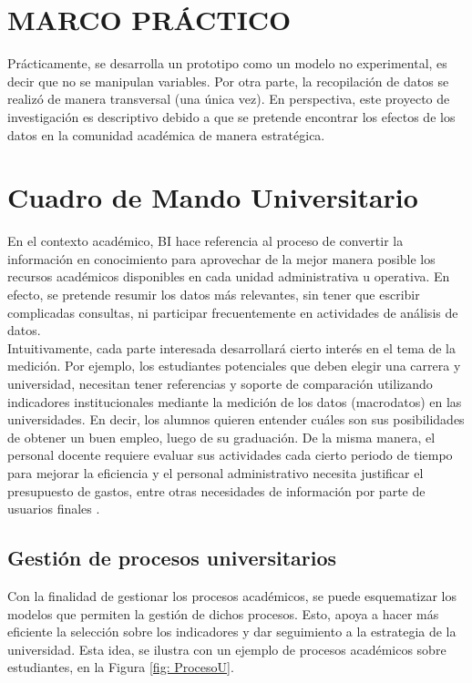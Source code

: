 \documentclass[12pt,jou]{apa7}
\begin{document}
\section{MARCO PRÁCTICO}
Prácticamente, se desarrolla un prototipo como un modelo no experimental, es decir que no se manipulan variables. Por otra parte, la recopilación de datos se realizó de manera transversal (una única vez). En perspectiva, este proyecto de investigación es descriptivo debido a que se pretende encontrar los efectos de los datos en la comunidad académica de manera estratégica.



\section{Cuadro de Mando Universitario}
En el contexto académico, BI hace referencia al proceso de convertir la información en conocimiento para aprovechar de la mejor manera posible los recursos académicos disponibles en cada unidad administrativa u operativa. En efecto, se pretende resumir los datos más relevantes, sin tener que escribir complicadas consultas, ni participar frecuentemente en actividades de análisis de datos.\\

Intuitivamente, cada parte interesada desarrollará cierto interés en el tema de la medición. Por ejemplo, los estudiantes potenciales que deben elegir una carrera y universidad, necesitan tener referencias y soporte de comparación utilizando indicadores institucionales mediante la medición de los datos (macrodatos) en las universidades. En decir, los alumnos quieren entender cuáles son sus posibilidades de obtener un buen empleo, luego de su graduación. De la misma manera, el personal docente requiere evaluar sus actividades cada cierto periodo de tiempo para mejorar la eficiencia y el personal administrativo necesita justificar el presupuesto de gastos, entre otras necesidades de información por parte de usuarios finales \cite{bscd}.


\subsection{Gestión de procesos universitarios}
Con la finalidad de gestionar los procesos académicos, se puede esquematizar los modelos que permiten la gestión de dichos procesos. Esto, apoya a hacer más eficiente la selección sobre los indicadores y dar seguimiento a la estrategia de la universidad. Esta idea, se ilustra con un ejemplo de procesos académicos sobre estudiantes, en la Figura \ref{fig: ProcesoU}.
\end{document}

